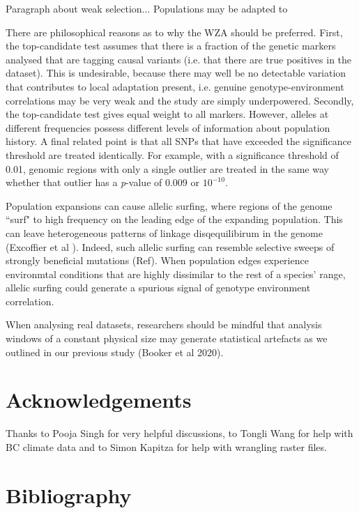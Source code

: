 \documentclass[11pt,twoside,lineno]{GSA_format}
\begin{document}
Paragraph about weak selection...
Populations may be adapted to 



There are philosophical reasons as to why the WZA should be preferred. First, the top-candidate test assumes that there is a fraction of the genetic markers analysed that are tagging causal variants (i.e. that there are true positives in the dataset). This is undesirable, because there may well be no detectable variation that contributes to local adaptation present, i.e. genuine genotype-environment correlations may be very weak and the study are simply underpowered. Secondly, the top-candidate test gives equal weight to all markers. However, alleles at different frequencies possess different levels of information about population history. A final related point is that all SNPs that have exceeded the significance threshold are treated identically. For example, with a significance threshold of 0.01, genomic regions with only a single outlier are treated in the same way whether that outlier has a \textit{p}-value of 0.009 or $10^{-10}$.

Population expansions can cause allelic surfing, where regions of the genome ``surf" to high frequency on the leading edge of the expanding population. This can leave heterogeneous patterns of linkage disqequilibirum in the genome (Excoffier et al ). Indeed, such allelic surfing can resemble selective sweeps of strongly beneficial mutations (Ref). When population edges experience environmtal conditions that are highly dissimilar to the rest of a species' range, allelic surfing could generate a spurious signal of genotype environment correlation.


When analysing real datasets, researchers should be mindful that analysis windows of a constant physical size may generate statistical artefacts as we outlined in our previous study (Booker et al 2020).


\section{Acknowledgements}

Thanks to Pooja Singh for very helpful discussions, to Tongli Wang for help with BC climate data and to Simon Kapitza for help with wrangling raster files. 


\section{Bibliography}
\end{document}
